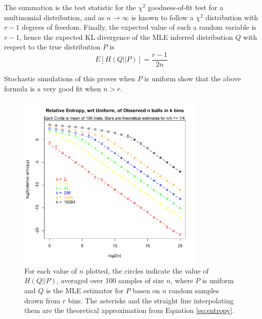 \documentclass[letterpaper]{article}
\begin{document}
The summation is the test statistic for the $\chi^2$ goodness-of-fit test for a
multinomial distribution, and as $n \rightarrow \infty$ is known to follow a
$\chi^2$ distribution with $r - 1$ degrees of freedom. Finally, the expected
value of such a random variable is $r - 1$, hence the expected KL divergence of
the MLE inferred distribution $Q$ with respect to the true distribution $P$ is
\begin{equation}
\label{eq:entropy}
E[H(Q||P)] = \frac{r - 1}{2n}
\end{equation}

Stochastic simulations of this proves when $P$ is uniform show that the above
formula is a very good fit when $n > r$.

\begin{figure}[H]
\centerline{\includegraphics[width=0.8\textwidth]{fig/entropy.pdf}}
\caption{For each value of $n$ plotted, the circles indicate the value of
$H(Q||P)$, averaged over 100 samples of size $n$, where $P$ is uniform and $Q$
is the MLE estimator for $P$ basen on $n$ random samples drawn from $r$ bins.
The asterisks and the straight line interpolating them are the theoretical
approximation from Equation \ref{eq:entropy}.
}
\label{fig:entropy}
\end{figure}



\end{document}
